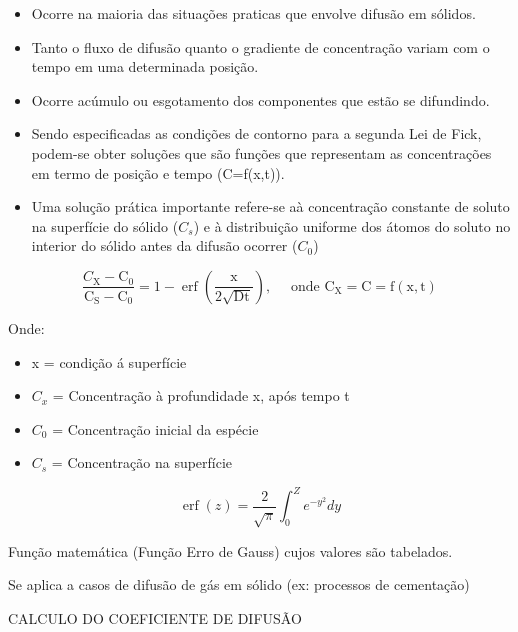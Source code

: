 \begin{itemize}
	\item Ocorre na maioria das situações praticas que envolve difusão em sólidos.
	\item Tanto o fluxo de difusão quanto o gradiente de concentração variam com o tempo em uma determinada posição.
	\item Ocorre acúmulo ou esgotamento dos componentes que estão se difundindo.
	\item Sendo especificadas as condições de contorno para a segunda Lei de Fick, podem-se obter soluções que são funções que representam as concentrações em termo de posição e tempo (C=f(x,t)).
	\item Uma solução prática importante refere-se aà concentração constante de soluto na superfície do sólido ($C_{s}$) e à distribuição uniforme dos átomos do soluto no interior do sólido antes da difusão  ocorrer ($C_{0}$)
\end{itemize}



\begin{equation}\label{key}
\frac{C_{\mathrm{X}}-\mathrm{C}_{0}}{\mathrm{C}_{\mathrm{S}}-\mathrm{C}_{0}}=1-\operatorname{erf}\left(\frac{\mathrm{x}}{2 \sqrt{\mathrm{D} \mathrm{t}}}\right), \quad \text { onde } \mathrm{C}_{\mathrm{X}}=\mathrm{C}=\mathrm{f}(\mathrm{x}, \mathrm{t})
\end{equation}


Onde:

\begin{itemize}
	\item x = condição á superfície
	\item $C_{x}$ = Concentração à profundidade x, após tempo t
	\item $C_{0}$ = Concentração inicial da espécie
	\item $C_{s}$ = Concentração na superfície
\end{itemize}


\begin{equation}\label{key}
\operatorname{erf}(z)=\frac{2}{\sqrt{\pi}} \int_{0}^{Z} e^{-y^{2}} d y
\end{equation}

Função matemática (Função Erro de Gauss) cujos valores são tabelados. 

Se aplica a casos de difusão de gás em sólido (ex: processos de cementação)

CALCULO DO COEFICIENTE DE DIFUSÃO




